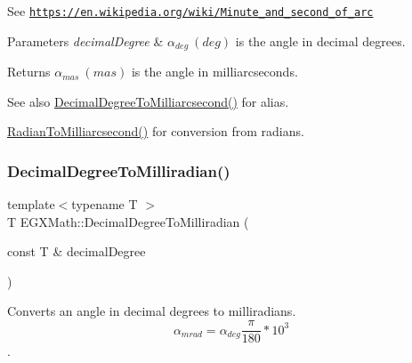 See \href{https://en.wikipedia.org/wiki/Minute_and_second_of_arc}{\tt https\+://en.\+wikipedia.\+org/wiki/\+Minute\+\_\+and\+\_\+second\+\_\+of\+\_\+arc} 
\begin{DoxyParams}{Parameters}
{\em decimal\+Degree} & $\alpha_{deg}\ (deg)$ is the angle in decimal degrees. \\
\hline
\end{DoxyParams}
\begin{DoxyReturn}{Returns}
$\alpha_{mas}\ (mas)$ is the angle in milliarcseconds. 
\end{DoxyReturn}
\begin{DoxySeeAlso}{See also}
\mbox{\hyperlink{group___e_g_x_math-_angle_conversions-_decimal_degree_gadb9ff3c92cf7484793f91e7de80c222e}{Decimal\+Degree\+To\+Milliarcsecond()}} for alias. 

\mbox{\hyperlink{group___e_g_x_math-_angle_conversions-_radian_ga84fbb494a455cfeb30be62776f96c9a9}{Radian\+To\+Milliarcsecond()}} for conversion from radians. 
\end{DoxySeeAlso}
\mbox{\label{group___e_g_x_math-_angle_conversions-_decimal_degree_gab567d02d4692d9642a4ad219e479713a}} 
\subsubsection{\texorpdfstring{Decimal\+Degree\+To\+Milliradian()}{DecimalDegreeToMilliradian()}}
{\footnotesize\ttfamily template$<$typename T $>$ \\
T E\+G\+X\+Math\+::\+Decimal\+Degree\+To\+Milliradian (\begin{DoxyParamCaption}\item[{const T \&}]{decimal\+Degree }\end{DoxyParamCaption})}



Converts an angle in decimal degrees to milliradians. \[\alpha_{mrad}=\alpha_{deg}\frac{\pi}{180}*10^3\]. 

